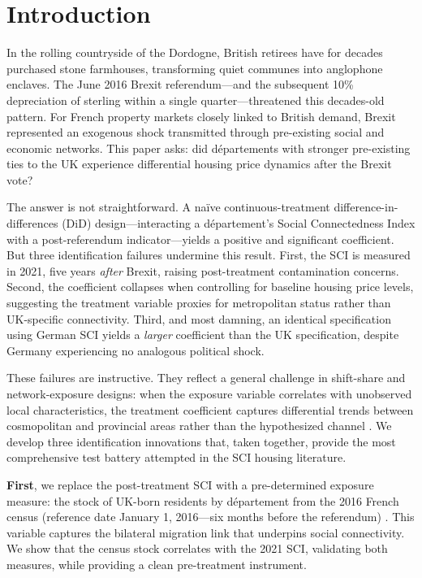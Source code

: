 \documentclass[12pt]{article}
\begin{document}
\section{Introduction}

In the rolling countryside of the Dordogne, British retirees have for decades purchased stone farmhouses, transforming quiet communes into anglophone enclaves. The June 2016 Brexit referendum---and the subsequent 10\% depreciation of sterling within a single quarter---threatened this decades-old pattern. For French property markets closely linked to British demand, Brexit represented an exogenous shock transmitted through pre-existing social and economic networks. This paper asks: did d\'epartements with stronger pre-existing ties to the UK experience differential housing price dynamics after the Brexit vote?

The answer is not straightforward. A na\"ive continuous-treatment difference-in-differences (DiD) design---interacting a d\'epartement's Social Connectedness Index \citep[SCI;][]{bailey2018social} with a post-referendum indicator---yields a positive and significant coefficient. But three identification failures undermine this result. First, the SCI is measured in 2021, five years \textit{after} Brexit, raising post-treatment contamination concerns. Second, the coefficient collapses when controlling for baseline housing price levels, suggesting the treatment variable proxies for metropolitan status rather than UK-specific connectivity. Third, and most damning, an identical specification using German SCI yields a \textit{larger} coefficient than the UK specification, despite Germany experiencing no analogous political shock.

These failures are instructive. They reflect a general challenge in shift-share and network-exposure designs: when the exposure variable correlates with unobserved local characteristics, the treatment coefficient captures differential trends between cosmopolitan and provincial areas rather than the hypothesized channel \citep{borusyak2022quasi, goldsmith2020bartik, adao2019shift}. We develop three identification innovations that, taken together, provide the most comprehensive test battery attempted in the SCI housing literature.

\textbf{First}, we replace the post-treatment SCI with a pre-determined exposure measure: the stock of UK-born residents by d\'epartement from the 2016 French census (reference date January 1, 2016---six months before the referendum) \citep{insee2019premiere}. This variable captures the bilateral migration link that underpins social connectivity. We show that the census stock correlates with the 2021 SCI, validating both measures, while providing a clean pre-treatment instrument.
\end{document}
